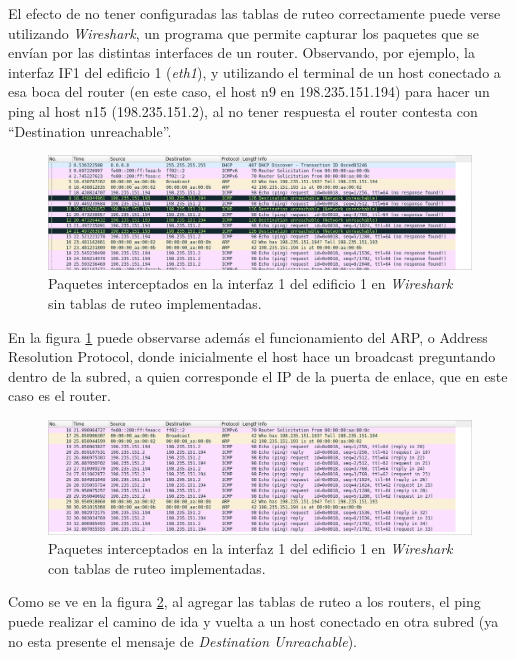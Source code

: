 El efecto de no tener configuradas las tablas de ruteo correctamente puede verse utilizando \textit{Wireshark}, un programa que permite capturar los paquetes que se envían por las distintas interfaces de un router. Observando, por ejemplo, la interfaz IF1 del edificio 1 (\textit{eth1}), y utilizando el terminal de un host conectado a esa boca del router (en este caso, el host n9 en 198.235.151.194) para hacer un ping al host n15 (198.235.151.2), al no tener respuesta el router contesta con \enquote{Destination unreachable}.\\

\begin{figure}[H]
    \centering
    \includegraphics[scale=0.5]{Imagenes/Wireshark - Sin ruteo.png}
    \caption{Paquetes interceptados en la interfaz 1 del edificio 1 en \textit{Wireshark} sin tablas de ruteo implementadas.\\}
    \label{ws_sin_ruteo}
\end{figure}

En la figura \ref{ws_sin_ruteo} puede observarse además el funcionamiento del ARP, o Address Resolution Protocol, donde inicialmente el host hace un broadcast preguntando dentro de la subred, a quien corresponde el IP de la puerta de enlace, que en este caso es el router.\\

\begin{figure}[H]
    \centering
    \includegraphics[scale=0.5]{Imagenes/Wireshark - Rutea2.png}
    \caption{Paquetes interceptados en la interfaz 1 del edificio 1 en \textit{Wireshark} con tablas de ruteo implementadas.\\}
    \label{ws_con_ruteo}
\end{figure}

Como se ve en la figura \ref{ws_con_ruteo}, al agregar las tablas de ruteo a los routers, el ping puede realizar el camino de ida y vuelta a un host conectado en otra subred (ya no esta presente el mensaje de \textit{Destination Unreachable}).